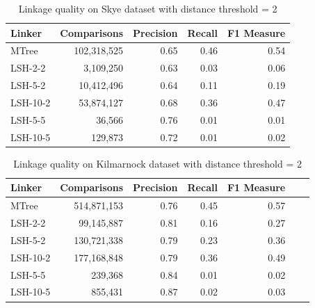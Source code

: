 \documentclass{llncs}
\begin{document}
\begin{table}[ht]
\centering
\begin{tabular}{l|r|r|r|r}
\parbox{0.2\textwidth}{\centering Linker} &
\parbox{0.2\textwidth}{\centering Comparisons} &
\parbox{0.17\textwidth}{\centering Precision} &
\parbox{0.17\textwidth}{\centering Recall} &
\parbox{0.17\textwidth}{\centering F1 Measure} \\ \hline \hline
MTree    & 102,318,525                 & 0.65      & 0.46   & 0.54      \\ \hline

LSH-2-2  & 3,109,250                   & 0.63      & 0.03   & 0.06       \\

LSH-5-2  & 10,412,496                  & 0.64      & 0.11   & 0.19       \\

LSH-10-2 & 53,874,127                  & 0.68      & 0.36   & 0.47       \\

LSH-5-5  & 36,566                     & 0.76      & 0.01   & 0.01       \\

LSH-10-5 & 129,873                    & 0.72      & 0.01   & 0.02       \\ \hline
\end{tabular}
\caption{Linkage quality on Skye dataset with distance threshold = 2
\label{comparison-of-results-demography-skye}
}
\end{table}


\begin{table}[ht]
\centering
\begin{tabular}{l|r|r|r|r|r|r}
\parbox{0.2\textwidth}{\centering Linker} &
\parbox{0.2\textwidth}{\centering Comparisons} &
\parbox{0.17\textwidth}{\centering Precision} &
\parbox{0.17\textwidth}{\centering Recall} &
\parbox{0.17\textwidth}{\centering F1 Measure} \\ \hline \hline
MTree     & 514,871,153                   & 0.76      & 0.45   & 0.57      \\ \hline
LSH-2-2   & 99,145,887                    & 0.81      & 0.16   & 0.27       \\
LSH-5-2   & 130,721,338                   & 0.79      & 0.23   & 0.36       \\
LSH-10-2  & 177,168,848                   & 0.79      & 0.36   & 0.49       \\
LSH-5-5   & 239,368                      & 0.84      & 0.01   & 0.02       \\
LSH-10-5  & 855,431                      & 0.87      & 0.02   & 0.03 \\ \hline
\end{tabular}
\caption{Linkage quality on Kilmarnock dataset with distance threshold = 2
\label{comparison-of-results-demography-kili}
}
\end{table}
\end{document}
